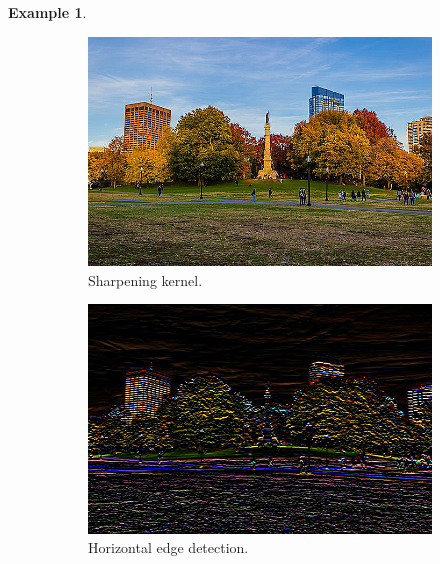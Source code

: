 \documentclass{article}
\theoremstyle{definition}
\newtheorem{example}{Example}[section]
\theoremstyle{remark}
\theoremstyle{definition}
\begin{document}
\begin{example}
\begin{figure}[hbt!]
        \begin{subfigure}[b]{0.32\textwidth}
        \centering
            \includegraphics[width=\textwidth]{img/OpenCV/Sharpen.png}
            \caption{Sharpening kernel. } \label{fig:sharpened_image}
        \end{subfigure} 
        \begin{subfigure}[b]{0.32\textwidth}
        \centering
            \includegraphics[width=\textwidth]{img/OpenCV/Horizontal.png}
            \caption{Horizontal edge detection. }
            \label{fig:horizontal_edge}
        \end{subfigure}
        \begin{subfigure}[b]{0.32\textwidth}
        \centering

\end{subfigure}
\end{figure}
\end{example}
\end{document}
